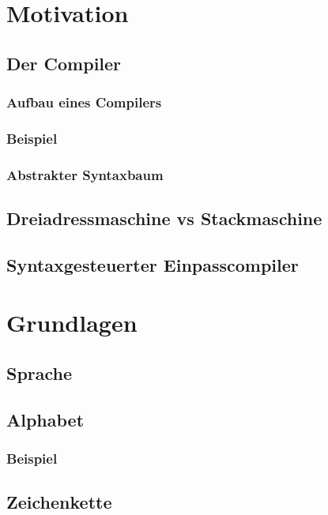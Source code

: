 \section{Motivation}
\subsection{Der Compiler}
\subsubsection{Aufbau eines Compilers}
\subsubsection{Beispiel}
\subsubsection*{Abstrakter Syntaxbaum}
\subsection{Dreiadressmaschine vs Stackmaschine}
\subsection{Syntaxgesteuerter Einpasscompiler}

\section{Grundlagen}
\subsection{Sprache}
\subsection{Alphabet}
\subsubsection*{Beispiel}
\subsection{Zeichenkette}
